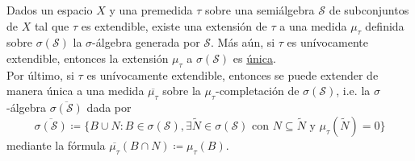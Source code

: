 \begin{theorem}
	Dados un espacio $X$ y una premedida $\tau$ sobre una semiálgebra $\mathscr{S}$ de subconjuntos de $X$ tal que $\tau$ es extendible, existe una extensión de $\tau$ a una medida $\mu_{\tau}$ definida sobre $\sigma(\mathscr{S})$ la $\sigma$-álgebra generada por $\mathscr{S}$. Más aún, si $\tau$ es unívocamente extendible, entonces la extensión $\mu_{\tau}$ a $\sigma(\mathscr{S})$ es \underline{única}. \\
	Por último, si $\tau$ es unívocamente extendible, entonces se puede extender de manera única a una medida $\overline{\mu_{\tau}}$ sobre la $\mu_{\tau}$-completación de $\sigma(\mathscr{S})$, i.e. la $\sigma$-álgebra $\overline{\sigma(\mathscr{S})}$ dada por
	\[ \overline{\sigma(\mathscr{S})} \coloneq \{ B \cup N : B \in \sigma(\mathscr{S}), \exists \widetilde{N} \in \sigma(\mathscr{S}) \text{ con } N \subseteq \widetilde{N} \text{ y } \mu_{\tau} (\widetilde{N}) = 0 \} \]
	\noindent mediante la fórmula $\overline{\mu_{\tau}}(B\cap N) \coloneq \mu_{\tau}(B)$.
\end{theorem}
